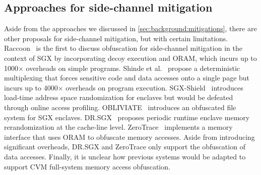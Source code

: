 \subsection{Approaches for side-channel mitigation}
Aside from the approaches we discussed in \cref{sec:background:mitigations}, there are other proposals for side-channel mitigation, but with certain limitations.
Raccoon~\cite{rane2015raccoon} is the first to discuss obfuscation for side-channel mitigation in the context of SGX by incorporating decoy execution and ORAM, which incurs up to 1000$\times$ overheads on simple programs.
Shinde et al.~\cite{shinde2016preventing} propose a deterministic multiplexing that forces sensitive code and data accesses onto a single page but incurs up to 4000$\times$ overheads on program execution.
SGX-Shield~\cite{seo2017sgxshield} introduces load-time address space randomization for enclaves but would be defeated through online access profiling.
OBLIVIATE~\cite{ahmad2018obliviate} introduces an obfuscated file system for SGX enclaves.
DR.SGX~\cite{brasser2019drsgx} proposes periodic runtime enclave memory rerandomization at the cache-line level.
ZeroTrace~\cite{sasy2018zerotrace} implements a memory interface that uses ORAM to obfuscate memory accesses.
Aside from introducing significant overheads, DR.SGX and ZeroTrace only support the obfuscation of data accesses.
Finally, it is unclear how previous systems would be adapted to support CVM full-system memory access obfuscation.






